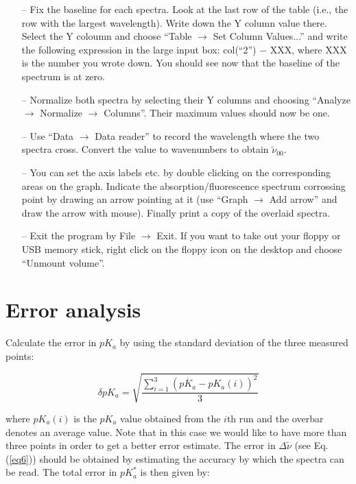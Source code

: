 \documentclass[byrevtex,amssymb,aps,pra,floatfix,letterpaper]{revtex4}
\begin{document}
\begin{itemize}
\begin{itemize}
\item[--] Fix the baseline for each spectra. Look at the last row of the table (i.e., the row with the largest wavelength). Write down the Y column value there. Select the Y coloumn and choose ``Table $\rightarrow$ Set Column Values...'' and write the following expression in the large input box: col(``2'') $-$ XXX, where XXX is the number you wrote down. You should see now that the baseline of the spectrum is at zero.

\item[--] Normalize both spectra by selecting their Y columns and choosing ``Analyze $\rightarrow$ Normalize $\rightarrow$ Columns''. Their maximum values should now be one.

\item[--] Use ``Data $\rightarrow$ Data reader'' to record the wavelength where the two spectra cross. Convert the value to wavenumbers to obtain $\tilde{\nu}_{00}$.

\item[--] You can set the axis labels etc. by double clicking on the corresponding areas on the graph. Indicate the absorption/fluorescence spectrum corrossing point by drawing an arrow pointing at it (use ``Graph $\rightarrow$ Add arrow'' and draw the arrow with mouse). Finally print a copy of the overlaid spectra.

\item[--] Exit the program by File $\rightarrow$ Exit. If you want to take out your floppy or USB memory stick, right click on the floppy icon on the desktop and choose ``Unmount volume''.

\end{itemize}
\end{itemize}

\section{Error analysis}

Calculate the error in $pK_a$ by using the standard deviation of the three measured points:

\begin{equation}
\label{eq13}
\delta pK_a = \sqrt{\frac{\sum\limits_{i=1}^{3}\left(\overline{pK_a} - pK_a(i)\right)^2}{3}}
\end{equation}

\noindent
where $pK_a(i)$ is the $pK_a$ value obtained from the $i$th run and the overbar denotes an average value. Note that in this case we would like to have more than three points in order to get a better error estimate. The error in $\Delta\tilde{\nu}$ (see Eq. (\ref{eq6})) should be obtained by estimating the accuracy by which the spectra can be read. The total error in $pK_a^*$ is then given by:
\end{document}
